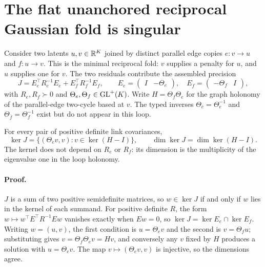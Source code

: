 \section{The flat unanchored reciprocal Gaussian fold is singular}
\label{sec:obs-cycle}

Consider two latents \(u,v\in\mathbb R^K\) joined by distinct parallel edge copies
\(e:v\to u\) and \(f:u\to v\). This is the minimal reciprocal fold:
\(v\) supplies a penalty for \(u\), and \(u\) supplies one for \(v\). The
two residuals contribute the assembled precision
\begin{equation}
J=E_e^{\top}R_e^{-1}E_e+E_f^{\top}R_f^{-1}E_f,
\qquad
E_e=\begin{pmatrix}I&-\Theta_e\end{pmatrix},
\quad
E_f=\begin{pmatrix}-\Theta_f&I\end{pmatrix},
\label{eq:obs-pair-precision}
\end{equation}
with \(R_e,R_f\succ0\) and
\(\Theta_e,\Theta_f\in\mathrm{GL}^+(K)\). Write
\(H=\Theta_f\Theta_e\) for the graph holonomy of the parallel-edge
two-cycle based at \(v\). The typed inverses
\(\Theta_{\bar e}=\Theta_e^{-1}\) and
\(\Theta_{\bar f}=\Theta_f^{-1}\) exist but do not appear in this loop.

For every pair of positive definite link covariances,
\begin{equation}
\ker J=\bigl\{(\Theta_ev, v) : v\in\ker(H-I)\bigr\},
\qquad
\dim\ker J=\dim\ker(H-I).
\label{eq:obs-pair-kernel}
\end{equation}
The kernel does not depend on \(R_e\) or \(R_f\): its dimension is the
multiplicity of the eigenvalue one in the loop holonomy.

\paragraph{Proof.}
$J$ is a sum of two positive semidefinite matrices, so $w\in\ker J$ if and only if $w$ lies in the kernel of each summand. For positive definite $R$, the form $w\mapsto w^{\top}E^{\top}R^{-1}Ew$ vanishes exactly when $Ew=0$, so $\ker J=\ker E_e\cap\ker E_f$. Writing $w=(u,v)$, the first condition is $u=\Theta_ev$ and the second is $v=\Theta_fu$; substituting gives $v=\Theta_f\Theta_ev=Hv$, and conversely any $v$ fixed by $H$ produces a solution with $u=\Theta_ev$. The map $v\mapsto(\Theta_ev,v)$ is injective, so the dimensions agree.


